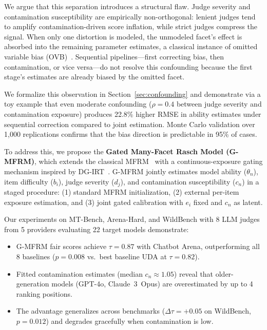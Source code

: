 \documentclass[11pt]{article}
\newcommand{\gmfrm}{\textsc{G-MFRM}}
\newcommand{\ei}{e_i}
\newcommand{\cn}{c_n}
\newcommand{\djud}{d_j}
\newcommand{\bitem}{b_i}
\begin{document}
We argue that this separation introduces a structural flaw. Judge severity and contamination susceptibility are empirically non-orthogonal: lenient judges tend to amplify contamination-driven score inflation, while strict judges compress the signal. When only one distortion is modeled, the unmodeled facet's effect is absorbed into the remaining parameter estimates, a classical instance of omitted variable bias (OVB)~\citep{angrist2009mostly}. Sequential pipelines---first correcting bias, then contamination, or vice versa---do not resolve this confounding because the first stage's estimates are already biased by the omitted facet.

We formalize this observation in Section~\ref{sec:confounding} and demonstrate via a toy example that even moderate confounding ($\rho = 0.4$ between judge severity and contamination exposure) produces 22.8\% higher RMSE in ability estimates under sequential correction compared to joint estimation. Monte Carlo validation over 1{,}000 replications confirms that the bias direction is predictable in 95\% of cases.

To address this, we propose the \textbf{Gated Many-Facet Rasch Model (\gmfrm{})}, which extends the classical MFRM~\citep{linacre1989mfrm,eckes2011introduction} with a continuous-exposure gating mechanism inspired by DG-IRT~\citep{shu2013psychometrika}. \gmfrm{} jointly estimates model ability ($\theta_n$), item difficulty ($\bitem$), judge severity ($\djud$), and contamination susceptibility ($\cn$) in a staged procedure: (1) standard MFRM initialization, (2) external per-item exposure estimation, and (3) joint gated calibration with $\ei$ fixed and $\cn$ as latent.

Our experiments on MT-Bench, Arena-Hard, and WildBench with 8 LLM judges from 5 providers evaluating 22 target models demonstrate:
\begin{itemize}[nosep,leftmargin=*]
\item \gmfrm{} fair scores achieve $\tau = 0.87$ with Chatbot Arena, outperforming all 8 baselines ($p = 0.008$ vs.\ best baseline UDA at $\tau = 0.82$).
\item Fitted contamination estimates (median $\cn \approx 1.05$) reveal that older-generation models (GPT-4o, Claude~3~Opus) are overestimated by up to 4 ranking positions.
\item The advantage generalizes across benchmarks ($\Delta\tau = +0.05$ on WildBench, $p = 0.012$) and degrades gracefully when contamination is low.
\end{itemize}
\end{document}
